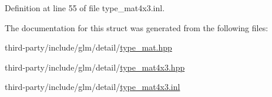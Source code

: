 Definition at line 55 of file type\+\_\+mat4x3.\+inl.



The documentation for this struct was generated from the following files\+:\begin{DoxyCompactItemize}
\item 
third-\/party/include/glm/detail/\hyperlink{type__mat_8hpp}{type\+\_\+mat.\+hpp}\item 
third-\/party/include/glm/detail/\hyperlink{type__mat4x3_8hpp}{type\+\_\+mat4x3.\+hpp}\item 
third-\/party/include/glm/detail/\hyperlink{type__mat4x3_8inl}{type\+\_\+mat4x3.\+inl}\end{DoxyCompactItemize}
